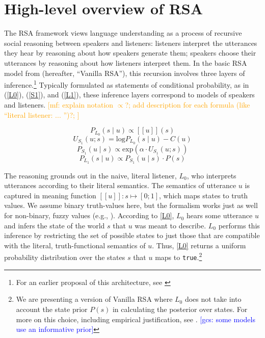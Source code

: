 \documentclass{sp}
\newcommand{\gcs}[1]{\textcolor{blue}{[gcs: #1]}}
\newcommand{\mf}[1]{\textcolor{orange}{[mf: #1]}}
\newcommand{\mht}[1]{\textcolor{purple}{[mht: #1]}}
\newcommand{\sem}[1]{\ensuremath{[\![#1]\!]}}
\begin{document}
\section{High-level overview of RSA} \label{overview}

The RSA framework views language understanding as a process of recursive social reasoning between speakers and listeners: listeners interpret the utterances they hear by reasoning about how speakers generate them; speakers choose their utterances by reasoning about how listeners interpret them. In the basic RSA model from \cite{frankgoodman2012} (hereafter, ``Vanilla RSA''), this recursion involves three layers of inference.\footnote{For an earlier proposal of this architecture, see \cite{BenzvanRooijOptimalAssertions2007}} Typically formulated as statements of conditional probability, as in (\ref{L0}), (\ref{S1}), and (\ref{L1}), these inference layers correspond to models of speakers and listeners. \mf{explain notation $\propto$?; add description for each formula (like ``literal listener: ... '')?; }

\begin{equation} \label{L0}
P_{L_0}(s \mid u) \propto \sem{u}(s)
\end{equation}
\begin{equation} \label{U}
U_{S_1}(u; s) = \textrm{log}P_{L_0}(s \mid u) - C(u)
\end{equation}
\begin{equation} \label{S1}
P_{S_1}(u \mid s) \propto \textrm{exp}(\alpha \cdot U_{S_1}(u;s))
\end{equation}
\begin{equation} \label{L1}
P_{L_1}(s \mid u) \propto P_{S_1}(u \mid s) \cdot P(s)
\end{equation}

The reasoning grounds out in the naive, literal listener, $L_0$, who interprets utterances
according to their literal semantics. The semantics of utterance $u$ is captured in meaning
function $\sem{u} \colon s \mapsto [0;1]$, which maps states to truth values. We assume binary
truth-values here, but the formalism works just as well for non-binary, fuzzy values (e.g., \citealp{degenetal2020}). 
According to \eqref{L0}, $L_0$ hears some utterance $u$ and infers the state of the world $s$ that $u$ was
meant to describe. $L_0$ performs this inference by restricting the set of possible states to just those that are compatible
with the literal, truth-functional semantics of $u$.
Thus, \eqref{L0} returns a uniform probability distribution over the states $s$ that $u$ maps to \texttt{true}.\footnote{We are presenting a version of Vanilla RSA where $L_0$ does not take into account the state prior $P(s)$ in calculating the posterior over states. For more on this choice, including empirical justification, see \cite{qingfranke2015}. \gcs{some models use an informative prior}}
\end{document}
